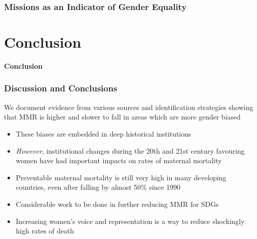 \documentclass[10pt,letterpaper,subeqn]{beamer}
\begin{document}
\begin{frame}[label=MissionsTab]
\frametitle{Missions as an Indicator of Gender Equality}

\vspace{1cm}
\end{frame}



\section{Conclusion}
\begin{frame}[plain]
\begin{center}
\textbf{Conclusion}
\end{center}
\end{frame}


\begin{frame}
\frametitle{Discussion and Conclusions}
We document evidence from various sources and identification strategies showing
that MMR is higher and slower to fall in areas which are more gender biased
\vspace{3mm}
\begin{itemize}
  \setlength{\itemsep}{10pt}
  \item These biases are embedded in deep historical institutions
  \item \emph{However}, institutional changes during the 20th and 21st century
    favouring women have had important impacts on rates of maternal mortality
  \item Preventable maternal mortality is still very high in many developing 
    countries, even after falling by almost 50\% since 1990
  \item Considerable work to be done in further reducing MMR for SDGs
  \item Increasing women's voice and representation is a way to reduce shockingly
    high rates of death
\end{itemize}
\end{frame}
\end{document}
